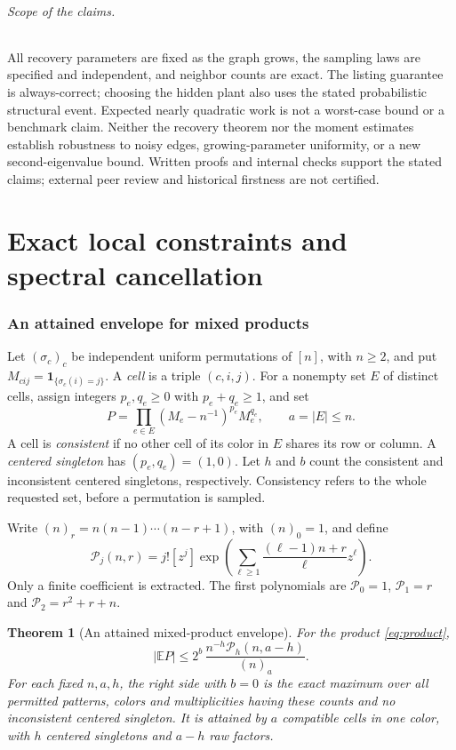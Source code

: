 \documentclass[11pt]{article}
\newtheorem{theorem}{Theorem}[section]
\theoremstyle{definition}
\theoremstyle{remark}
\newcommand{\E}{\mathbb E}
\newcommand{\1}{\mathbf 1}
\begin{document}
\paragraph{Scope of the claims.}
All recovery parameters are fixed as the graph grows, the sampling laws
are specified and independent, and neighbor counts are exact. The
listing guarantee is always-correct; choosing the hidden plant also uses
the stated probabilistic structural event. Expected nearly quadratic
work is not a worst-case bound or a benchmark claim. Neither the
recovery theorem nor the moment estimates establish robustness to noisy
edges, growing-parameter uniformity, or a new second-eigenvalue bound.
Written proofs and internal checks support the stated claims; external
peer review and historical firstness are not certified.

\part{Exact local constraints and spectral cancellation}
\section{An attained envelope for mixed products}\label{sec:mixed}

Let $(\sigma_c)_c$ be independent uniform permutations of $[n]$, with $n\ge2$, and put $M_{cij}=\1_{\{\sigma_c(i)=j\}}$. A \emph{cell} is a triple $(c,i,j)$. For a nonempty set $E$ of distinct cells, assign integers $p_e,q_e\ge0$ with $p_e+q_e\ge1$, and set
\begin{equation}\label{eq:product}
P=\prod_{e\in E}(M_e-n^{-1})^{p_e}M_e^{q_e},\qquad a=|E|\le n.
\end{equation}
A cell is \emph{consistent} if no other cell of its color in $E$ shares its row or column. A \emph{centered singleton} has $(p_e,q_e)=(1,0)$. Let $h$ and $b$ count the consistent and inconsistent centered singletons, respectively. Consistency refers to the whole requested set, before a permutation is sampled.

Write $(n)_r=n(n-1)\cdots(n-r+1)$, with $(n)_0=1$, and define
\begin{equation}\label{eq:depletedpoly}
\mathcal P_j(n,r)
=j![z^j]\exp\left(\sum_{\ell\ge1}
\frac{(\ell-1)n+r}{\ell}z^\ell\right).
\end{equation}
Only a finite coefficient is extracted. The first polynomials are
$\mathcal P_0=1$, $\mathcal P_1=r$ and $\mathcal P_2=r^2+r+n$.

\begin{theorem}[An attained mixed-product envelope]\label{thm:mixed}
For the product \eqref{eq:product},
\begin{equation}\label{eq:mixedexact}
|\E P|\le 2^b\,\frac{n^{-h}\mathcal P_h(n,a-h)}{(n)_a}.
\end{equation}
For each fixed $n,a,h$, the right side with $b=0$ is the exact maximum over all permitted patterns, colors and multiplicities having these counts and no inconsistent centered singleton. It is attained by $a$ compatible cells in one color, with $h$ centered singletons and $a-h$ raw factors.
\end{theorem}
\end{document}
